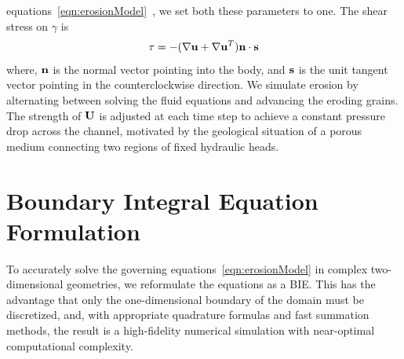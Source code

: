 \documentclass{jfm}
\begin{document}
equations~\eqref{eqn:erosionModel}~\citep{qua-moo2018}, we set both
these parameters to one. The shear stress on $\gamma$ is
\begin{align}
  \tau = -(\nabla \uu + \nabla \uu^T) \nn \cdot \ss
  \label{eqn:shearStress}
\end{align}
where, $\nn$ is the normal vector pointing into the body, and $\ss$ is
the unit tangent vector pointing in the counterclockwise direction. We
simulate erosion by alternating between solving the fluid equations and
advancing the eroding grains.  The strength of $\UU$ is adjusted at each
time step to achieve a constant pressure drop across the channel,
motivated by the geological situation of a porous medium connecting two
regions of  fixed hydraulic heads.

\section{Boundary Integral Equation Formulation}
\label{sec:DLP}
To accurately solve the governing equations~\eqref{eqn:erosionModel} in
complex two-dimensional geometries, we reformulate the equations as a
BIE.  This has the advantage that only the one-dimensional boundary of
the domain must be discretized, and, with appropriate quadrature
formulas and fast summation methods, the result is a high-fidelity
numerical simulation with near-optimal computational complexity.

\end{document}
